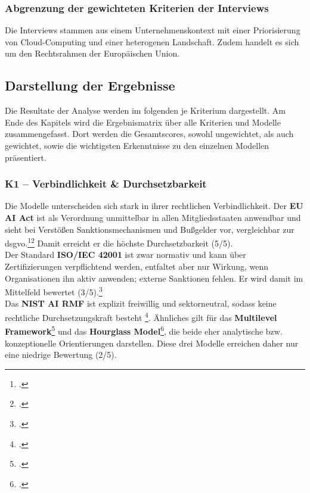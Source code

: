 \subsubsection{Abgrenzung der gewichteten Kriterien der Interviews}
Die Interviews stammen aus einem Unternehmenskontext mit einer Priorisierung von Cloud-Computing und einer heterogenen Landschaft.
Zudem handelt es sich um den Rechtsrahmen der Europäischen Union.

\subsection{Darstellung der Ergebnisse}
\label{subsec:darstellung}
Die Resultate der Analyse werden im folgenden je Kriterium dargestellt.
Am Ende des Kapitels wird die Ergebnismatrix über alle Kriterien und Modelle zusammengefasst.
Dort werden die Gesamtscores, sowohl ungewichtet, als auch gewichtet, sowie die wichtigsten Erkenntnisse zu den einzelnen Modellen präsentiert.

\subsubsection{K1 – Verbindlichkeit \& Durchsetzbarkeit}
Die Modelle unterscheiden sich stark in ihrer rechtlichen Verbindlichkeit. 
Der \textbf{EU AI Act} ist als Verordnung unmittelbar in allen Mitgliedsstaaten anwendbar und sieht bei Verstößen Sanktionsmechanismen und Bußgelder vor, vergleichbar zur \ac{dsgvo}.\footcite[][]{kimAIGovernanceContext2025}\footcite{europeanparliamentaryresearchserviceArtificialIntelligenceAct2024}
Damit erreicht er die höchste Durchsetzbarkeit (5/5).  
\\
Der Standard \textbf{ISO/IEC 42001} ist zwar normativ und kann über Zertifizierungen verpflichtend werden, entfaltet aber nur Wirkung, wenn Organisationen ihn aktiv anwenden; externe Sanktionen fehlen.
Er wird damit im Mittelfeld bewertet (3/5).\footcite[][]{isoISOIEC42001}
\\
Das \textbf{NIST AI RMF} ist explizit freiwillig und sektorneutral, sodass keine rechtliche Durchsetzungskraft besteht \footcite[][]{nationalinstituteofstandardsandtechnologyAIRiskManagement2021}. 
Ähnliches gilt für das \textbf{Multilevel Framework}\footcite[][]{choungMultilevelFrameworkAI2023} und das \textbf{Hourglass Model}\footcite[][]{mantymakiPDFPuttingAI2025}, die beide eher analytische bzw. konzeptionelle Orientierungen darstellen. 
Diese drei Modelle erreichen daher nur eine niedrige Bewertung (2/5).  

